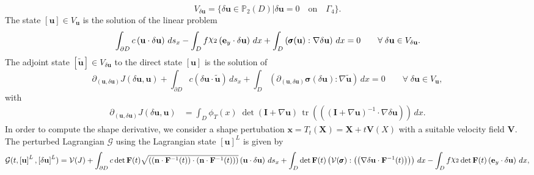 \documentclass[preview]{standalone}
\let\oldcdot\cdot
\let\cdot\oldcdot
\begin{document}
\begin{equation*}
V_{{\delta\mathbf{  u }}} = \{ {\delta\mathbf{  u }} \in \mathbb P_{2}(D)| {\delta\mathbf{  u }} = 0  \quad \text{{on}} \quad\Gamma_{4} \}.\end{equation*}
The state $\left[ {\mathbf{ u }}\right] \in  V_{{\mathbf{ u }}}$ is the solution of the linear problem
\begin{dmath*}
 \int_{\partial D} c \left( {\mathbf{ u }} \cdot {\delta\mathbf{  u }} \right) \,ds_x -  \int_{D} f \raisebox{\depth}{$\chi_2$} \left( \mathbf e_y \cdot {\delta\mathbf{  u }} \right) \,dx +  \int_{D} \left( \pmb \sigma({\mathbf{ u }}) \mathrel{:}  \nabla {\delta\mathbf{  u }}  \right) \,dx = 0\qquad \forall\; {{\delta\mathbf{  u }}\in V_{{\delta\mathbf{  u }}}} . 
\end{dmath*}
The adjoint state $\left[ \tilde{\mathbf{ u }}\right] \in  V_{{\delta\mathbf{  u }}}$ to the direct state $\left[ {\mathbf{ u }}\right]$ is the solution of
\begin{dmath*}
\partial_{({\mathbf{ u }},{\delta\mathbf{  u }})} J({\delta\mathbf{  u }},{\mathbf{ u }}) +  \int_{\partial D} c \left( {\delta\mathbf{  u }} \cdot \tilde{\mathbf{ u }} \right) \,ds_x +  \int_{D} \left( \partial_{({\mathbf{ u }},{\delta\mathbf{  u }})} \pmb \sigma({\delta\mathbf{  u }}) \mathrel{:}  \nabla \tilde{\mathbf{ u }}  \right) \,dx = 0\qquad \forall\; {{\delta\mathbf{  u }}\in V_{{\mathbf{ u }}}} , 
\end{dmath*}
with 
\begin{align*}
\partial_{({\mathbf{ u }},{\delta\mathbf{  u }})} J({\delta\mathbf{  u }},{\mathbf{ u }}) &=  \int_{D} \phi_{T}(x)  \;\operatorname{det}(\mathbf{I} +  \nabla {\mathbf{ u }} )   \,\operatorname{tr}\left(\left(  (\mathbf{I} +  \nabla {\mathbf{ u }} )^{-1}  \cdot  \nabla {\delta\mathbf{  u }}  \right)\right)  \,dx.
 \end{align*}
In order to compute the shape derivative, we consider a shape pertubation $\mathbf x = T_t(\mathbf X) = \mathbf X + t \mathbf  V(X)$ with a suitable velocity field $\mathbf V$. The perturbed Lagrangian $\mathcal G$ using the Lagrangian state $\left[ {\mathbf{ u }}\right]^{L}$ is given by
\begin{dmath*}
\mathcal G(t,\left[ {\mathbf{ u }}\right]^{L},\left[ {\delta\mathbf{  u }}\right]^{L}) = \mathcal V(J) +  \int_{\partial D} c  \operatorname{det}\mathbf F( t )  \sqrt{\left( \left( \mathbf n \cdot  \mathbf F^{-1}(t) \right) \cdot \left( \mathbf n \cdot  \mathbf F^{-1}(t) \right) \right)} \left( {\mathbf{ u }} \cdot {\delta\mathbf{  u }} \right) \,ds_x +  \int_{D}  \operatorname{det}\mathbf F( t )  \left( \mathcal V(\pmb \sigma) \mathrel{:} \left( \left(  \nabla {\delta\mathbf{  u }}  \cdot  \mathbf F^{-1}(t) \right) \right)\right) \,dx -  \int_{D} f \raisebox{\depth}{$\chi_2$}  \operatorname{det}\mathbf F( t )  \left( \mathbf e_y \cdot {\delta\mathbf{  u }} \right) \,dx , 
\end{dmath*}
\end{document}
